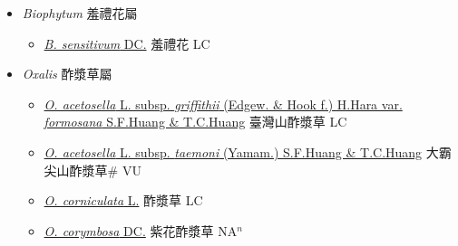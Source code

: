 
  \begin{itemize}
 \item[] \textit{Biophytum} 羞禮花屬
                    
  \begin{itemize}
        \item[] \href{http://www.theplantlist.org/tpl1.1/search?q=Biophytum+sensitivum}{\textit{B. sensitivum} DC.}   羞禮花 LC
  \end{itemize}
 \item[] \textit{Oxalis} 酢漿草屬
                    
  \begin{itemize}
        \item[] \href{http://www.theplantlist.org/tpl1.1/search?q=Oxalis+acetosella+subsp.+griffithii+var.+formosana}{\textit{O. acetosella} L. subsp. \textit{griffithii} (Edgew. \& Hook f.) H.Hara var. \textit{formosana} S.F.Huang \& T.C.Huang}   臺灣山酢漿草 LC
        \item[] \href{http://www.theplantlist.org/tpl1.1/search?q=Oxalis+acetosella+subsp.+taemoni}{\textit{O. acetosella} L. subsp. \textit{taemoni} (Yamam.) S.F.Huang \& T.C.Huang}   大霸尖山酢漿草\# VU
        \item[] \href{http://www.theplantlist.org/tpl1.1/search?q=Oxalis+corniculata}{\textit{O. corniculata} L.}   酢漿草 LC
        \item[] \href{http://www.theplantlist.org/tpl1.1/search?q=Oxalis+corymbosa}{\textit{O. corymbosa} DC.}   紫花酢漿草 NA$^n$
  \end{itemize}
  \end{itemize}
